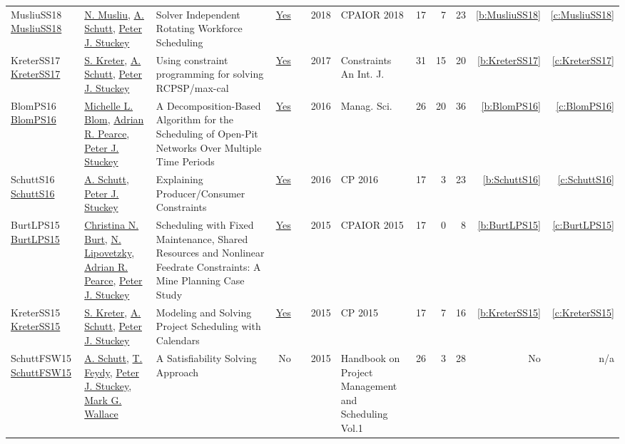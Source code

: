 {\begin{longtable}{>{\raggedright\arraybackslash}p{3cm}>{\raggedright\arraybackslash}p{6cm}>{\raggedright\arraybackslash}p{6.5cm}rrrp{2.5cm}rrrrr}
MusliuSS18 \href{https://doi.org/10.1007/978-3-319-93031-2\_31}{MusliuSS18} & \hyperref[auth:a45]{N. Musliu}, \hyperref[auth:a125]{A. Schutt}, \hyperref[auth:a126]{Peter J. Stuckey} & Solver Independent Rotating Workforce Scheduling & \href{works/MusliuSS18.pdf}{Yes} & \cite{MusliuSS18} & 2018 & CPAIOR 2018 & 17 & 7 & 23 & \ref{b:MusliuSS18} & \ref{c:MusliuSS18}\\
KreterSS17 \href{https://doi.org/10.1007/s10601-016-9266-6}{KreterSS17} & \hyperref[auth:a124]{S. Kreter}, \hyperref[auth:a125]{A. Schutt}, \hyperref[auth:a126]{Peter J. Stuckey} & Using constraint programming for solving RCPSP/max-cal & \href{works/KreterSS17.pdf}{Yes} & \cite{KreterSS17} & 2017 & Constraints An Int. J. & 31 & 15 & 20 & \ref{b:KreterSS17} & \ref{c:KreterSS17}\\
BlomPS16 \href{https://doi.org/10.1287/mnsc.2015.2284}{BlomPS16} & \hyperref[auth:a807]{Michelle L. Blom}, \hyperref[auth:a328]{Adrian R. Pearce}, \hyperref[auth:a126]{Peter J. Stuckey} & A Decomposition-Based Algorithm for the Scheduling of Open-Pit Networks Over Multiple Time Periods & \href{works/BlomPS16.pdf}{Yes} & \cite{BlomPS16} & 2016 & Manag. Sci. & 26 & 20 & 36 & \ref{b:BlomPS16} & \ref{c:BlomPS16}\\
SchuttS16 \href{https://doi.org/10.1007/978-3-319-44953-1\_28}{SchuttS16} & \hyperref[auth:a125]{A. Schutt}, \hyperref[auth:a126]{Peter J. Stuckey} & Explaining Producer/Consumer Constraints & \href{works/SchuttS16.pdf}{Yes} & \cite{SchuttS16} & 2016 & CP 2016 & 17 & 3 & 23 & \ref{b:SchuttS16} & \ref{c:SchuttS16}\\
BurtLPS15 \href{https://doi.org/10.1007/978-3-319-18008-3\_7}{BurtLPS15} & \hyperref[auth:a326]{Christina N. Burt}, \hyperref[auth:a327]{N. Lipovetzky}, \hyperref[auth:a328]{Adrian R. Pearce}, \hyperref[auth:a126]{Peter J. Stuckey} & Scheduling with Fixed Maintenance, Shared Resources and Nonlinear Feedrate Constraints: {A} Mine Planning Case Study & \href{works/BurtLPS15.pdf}{Yes} & \cite{BurtLPS15} & 2015 & CPAIOR 2015 & 17 & 0 & 8 & \ref{b:BurtLPS15} & \ref{c:BurtLPS15}\\
KreterSS15 \href{https://doi.org/10.1007/978-3-319-23219-5\_19}{KreterSS15} & \hyperref[auth:a124]{S. Kreter}, \hyperref[auth:a125]{A. Schutt}, \hyperref[auth:a126]{Peter J. Stuckey} & Modeling and Solving Project Scheduling with Calendars & \href{works/KreterSS15.pdf}{Yes} & \cite{KreterSS15} & 2015 & CP 2015 & 17 & 7 & 16 & \ref{b:KreterSS15} & \ref{c:KreterSS15}\\
SchuttFSW15 \href{https://doi.org/10.1007/978-3-319-05443-8_7}{SchuttFSW15} & \hyperref[auth:a125]{A. Schutt}, \hyperref[auth:a155]{T. Feydy}, \hyperref[auth:a126]{Peter J. Stuckey}, \hyperref[auth:a156]{Mark G. Wallace} & A Satisfiability Solving Approach & No & \cite{SchuttFSW15} & 2015 & Handbook on Project Management and Scheduling Vol.1 & 26 & 3 & 28 & No & n/a\\

\end{longtable}}
